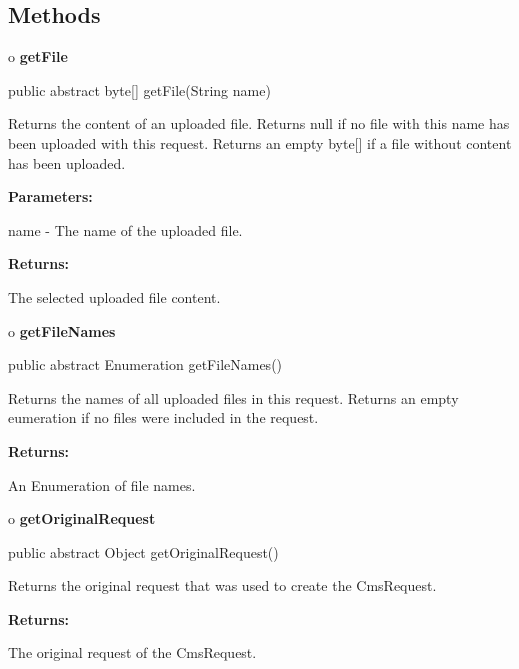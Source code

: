 \subsection*{  Methods }

o {\bf getFile} 

\begin{PRE}
 public abstract byte[] getFile(String name)
\end{PRE}

\begin{description}
\htmlDD Returns the content of an uploaded file. Returns null if no file with
this name has been uploaded with this request. Returns an empty byte[] if a
file without content has been uploaded. 

\begin{description}
\item {\bf Parameters:}  

name - The name of the uploaded file.  
\item {\bf Returns:}  

The selected uploaded file content.  
\end{description}

\end{description}

o {\bf getFileNames} 

\begin{PRE}
 public abstract Enumeration getFileNames()
\end{PRE}

\begin{description}
\htmlDD Returns the names of all uploaded files in this request. Returns an
empty eumeration if no files were included in the request. 

\begin{description}
\item {\bf Returns:}  

An Enumeration of file names.  
\end{description}

\end{description}

o {\bf getOriginalRequest} 

\begin{PRE}
 public abstract Object getOriginalRequest()
\end{PRE}

\begin{description}
\htmlDD Returns the original request that was used to create the CmsRequest. 

\begin{description}
\item {\bf Returns:}  

The original request of the CmsRequest.  
\end{description}

\end{description}

